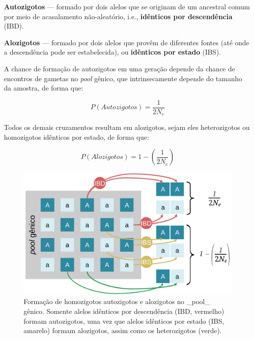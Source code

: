 \documentclass[
]{book}
\begin{document}
\textbf{Autozigotos} --- formado por dois alelos que se originam de um ancestral comum por meio de acasalamento não-aleatório, i.e., \textbf{idênticos por descendência} (IBD).

\textbf{Alozigotos} --- formado por dois alelos que provêm de diferentes fontes (até onde a descendência pode ser estabelecida), ou \textbf{idênticos por estado} (IBS).

A chance de formação de autozigotos em uma geração depende da chance de encontros de gametas no \emph{pool} gênico, que intrinsecamente depende do tamanho da amostra, de forma que:

\begin{equation}
  P(Autozigotos)=\frac{1}{2N_e}
  \label{eq:autozigotos}
\end{equation}

Todos os demais cruzamentos resultam em alozigotos, sejam eles heterozigotos ou homozigotos idênticos por estado, de forma que:

\begin{equation} 
   P(Alozigotos)= 1-\left(\frac{1}{2N_e}\right)
   \label{eq:alozigotos}
\end{equation}

\begin{figure}

{\centering \includegraphics[width=600px]{figs/auto_alo_zigotos} 

}

\caption{Formação de homozigotos autozigotos e alozigotos no _pool_ gênico. Somente alelos idênticos por descendência (IBD, vermelho) formam autozigotos, uma vez que alelos idênticos por estado (IBS, amarelo) formam alozigotos, assim como os heterozigotos (verde).}\label{fig:autozigotos}
\end{figure}
\end{document}
